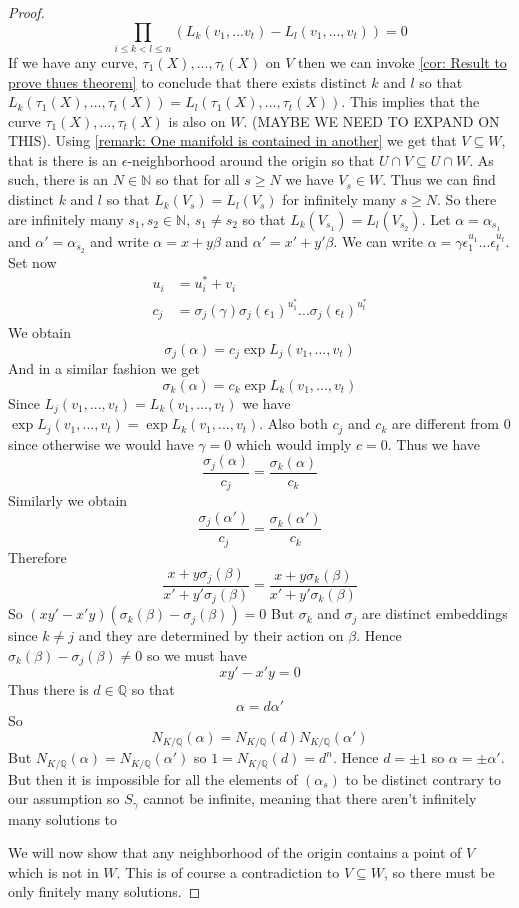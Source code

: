 \documentclass{article}
\newcommand{\mbb}[1]{\mathbb{#1}}
\begin{document}
\begin{proof}
    $$\prod_{i \leq k < l \leq n} (L_k(v_1, ...v_t) - L_l(v_1, ...,  v_t)) = 0$$
    If we have any curve, $\tau_1(X), ..., \tau_t(X)$ on $V$ then we can invoke \cref{cor: Result to prove thues theorem} to conclude that there exists distinct $k$ and $l$ so that $L_{k}(\tau_1(X), ..., \tau_t(X))= L_{l}(\tau_1(X), ..., \tau_t(X))$. This implies that the curve $\tau_1(X), ..., \tau_t(X)$ is also on $W$. (MAYBE WE NEED TO EXPAND ON THIS). Using \cref{remark: One manifold is contained in another} we get that $V \subseteq W$, that is there is an $\epsilon$-neighborhood around the origin so that $U \cap V \subseteq U \cap W$. As such, there is an $N \in \mbb N$ so that for all $s \geq N$ we have $V_s \in W$. Thus we can find distinct $k$ and $l$ so that $L_k(V_s) = L_l(V_s)$ for infinitely many $s \geq N$. So there are infinitely many $s_1, s_2 \in \mbb N$, $s_1 \neq s_2$ so that $L_k(V_{s_1}) = L_l(V_{s_2})$. Let $\alpha = \alpha_{s_1}$ and $\alpha' = \alpha_{s_2}$ and write $\alpha = x + y \beta$ and $\alpha' = x' + y'\beta$. We can write $\alpha = \gamma \epsilon_1^{u_1}...\epsilon_t^{u_t}$. Set now 
    \begin{align*}
        u_i &= u_i^* + v_i \\
        c_j &= \sigma_j(\gamma)\sigma_j(\epsilon_1)^{u_1^*}...\sigma_j(\epsilon_t)^{u_t^*}
    \end{align*}
    We obtain
    $$\sigma_j(\alpha) = c_j \exp L_j(v_1, ..., v_t)$$
    And in a similar fashion we get
    $$\sigma_k(\alpha) = c_k \exp L_k(v_1, ..., v_t)$$ 
    Since $L_j(v_1, ..., v_t) = L_k(v_1, ..., v_t)$ we have $\exp L_j(v_1, ..., v_t) = \exp L_k(v_1, ..., v_t)$. Also both $c_j$ and $c_k$ are different from 0 since otherwise we would have $\gamma = 0$ which would imply $c = 0$. Thus we have
    $$\frac{\sigma_j(\alpha)}{c_j} = \frac{\sigma_k(\alpha)}{c_k}$$
    Similarly we obtain 
    $$\frac{\sigma_j(\alpha')}{c_j} = \frac{\sigma_k(\alpha')}{c_k}$$
    Therefore
    $$\frac{x + y \sigma_j(\beta)}{x' + y' \sigma_j(\beta)} = \frac{x + y \sigma_k(\beta)}{x' + y' \sigma_k(\beta)}$$
    So
    $(xy' - x'y)(\sigma_k(\beta) - \sigma_j(\beta)) = 0$
    But $\sigma_k$ and $\sigma_j$ are distinct embeddings since $k \neq j$ and they are determined by their action on $\beta$. Hence $\sigma_k(\beta) - \sigma_j(\beta) \neq 0$ so we must have 
    $$xy' - x'y = 0$$
    Thus there is $d \in \mbb Q$ so that
    $$\alpha = d\alpha'$$
    So $$N_{K/\mbb Q}(\alpha) = N_{K/\mbb Q}(d) N_{K/\mbb Q}(\alpha')$$
    But $N_{K/\mbb Q}(\alpha) = N_{K/\mbb Q}(\alpha')$ so $1 = N_{K/\mbb Q}(d) = d^n$. Hence $d = \pm 1$ so $\alpha = \pm \alpha'$. But then it is impossible for all the elements of $(\alpha_s)$ to be distinct contrary to our assumption so $S_\gamma$ cannot be infinite, meaning that there aren't infinitely many solutions to 

    
    
    
    We will now show that any neighborhood of the origin contains a point of $V$ which is not in $W$. This is of course a contradiction to $V \subseteq W$, so there must be only finitely many solutions. 

\end{proof}
\end{document}
